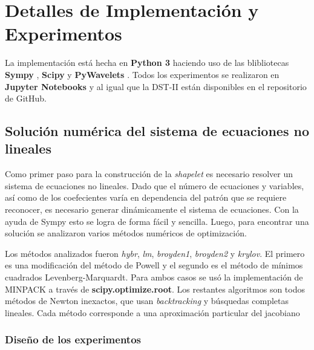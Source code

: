\chapter{Detalles de Implementación y Experimentos}\label{chapter:implementation}

La implementación está hecha en \textbf{Python 3} \cite{python3} haciendo uso de las blibliotecas \textbf{Sympy} \cite{10.7717/peerj-cs.103}, 
\textbf{Scipy} \cite{2020SciPy-NMeth} y \textbf{PyWavelets} \cite{Lee2019}. Todos los experimentos se 
realizaron en \textbf{Jupyter Notebooks} \cite{Kluyver2016jupyter} y al igual que la DST-II están disponibles en el repositorio de
GitHub.

\section{Solución numérica del sistema de ecuaciones no lineales}

Como primer paso para la construcción de la \textit{shapelet} es necesario resolver un sistema de ecuaciones
no lineales. Dado que el número de ecuaciones y variables, así como de los coefecientes varía en dependencia
del patrón que se requiere reconocer, es necesario generar dinámicamente el sistema de ecuaciones. Con la ayuda
de Sympy \cite{10.7717/peerj-cs.103} esto se logra de forma fácil y sencilla. Luego, para encontrar una solución 
se analizaron varios métodos numéricos de optimización.

Los métodos analizados fueron \textit{hybr}, \textit{lm}, \textit{broyden1}, \textit{broyden2} y \textit{krylov}.
El primero es una modificación del método de Powell y el segundo es el método de mínimos cuadrados Levenberg-Marquardt.
Para ambos casos se usó la implementación de MINPACK \cite{osti_6997568} a través de \textbf{scipy.optimize.root}. Los restantes
algoritmos son todos métodos de Newton inexactos, que usan \textit{backtracking}  y búsquedas completas lineales. Cada
método corresponde a una aproximación particular del jacobiano

\subsection{Diseño de los experimentos}

